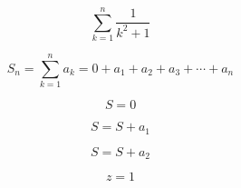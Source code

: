 \documentclass[b5paper]{article}
\begin{document}
$$\sum_{k=1}^{n}\frac{1}{k^{2}+1}$$

$$
S_{n}=\sum_{k=1}^{n}a_{k}=0+a_{1}+a_{2}+a_{3}+\cdots+a_{n}
$$

$$
S = 0
$$

$$
S= S+a_{1}
$$

$$
S=S+a_{2}
$$

$$z=1$$
\end{document}
